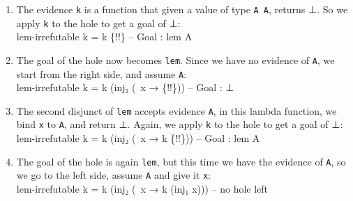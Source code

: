 \documentclass{lecturenotes}
\newcommand{\agdaempty}{\textsf{⊥}\xspace}
\begin{document}
\begin{itemize}
\begin{enumerate}
\item The evidence \texttt{k} is a function that given a value of type \texttt{A \uplus \lnot A},
      returns \agdaempty. So we apply \texttt{k} to the hole to get a goal of \agdaempty :
      \\ \textsf{lem-irrefutable k = k \{!!\} -- Goal : lem A} 

\item The goal of the hole now becomes \texttt{lem}. Since we have no evidence of \texttt{A},
      we start from the right side, and assume \texttt{\lnot A}:
      \\ \textsf{lem-irrefutable k = k (inj₂ (\lambda\ x → \{!!\})) -- Goal : \agdaempty}

\item The second disjunct of \texttt{lem} accepts evidence \texttt{\lnot A}, in this lambda function, we bind \texttt{x}
      to \texttt{A}, and return \agdaempty. Again, we apply \texttt{k} to the hole to get a goal of \agdaempty :
      \\ \textsf{lem-irrefutable k = k (inj₂ (\lambda\ x → k \{!!\})) -- Goal : lem A}

\item The goal of the hole is again \texttt{lem}, but this time we have the evidence of \texttt{A},
      so we go to the left side, assume \texttt{A} and give it \texttt{x}:
      \\ \textsf{lem-irrefutable k = k (inj₂ (\lambda\ x → k (inj₁ x))) -- no hole left}
\end{enumerate}
\end{itemize} %
\end{document}
